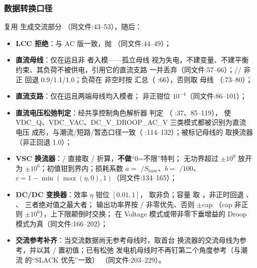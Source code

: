\subsubsection*{数据转换口径}
 复用  生成交流部分
（同文件:43--53），随后：
\begin{itemize}
  \item \textbf{LCC 拒绝}：与 AC 版一致，抛 
        （同文件:44--49）；
  \item \textbf{直流母线}：仅在运且非  者入模——孤立母线
        视为失电，不建变量、不建平衡约束、其负荷不被供电，引用它的直流支路
        一并丢弃（同文件:57--66）；// 非正
        回退 0.9/1.1/1.0；负荷在  非空时按
         汇总（
        :66），否则取
        母线 （:73--80）；
  \item \textbf{直流支路}：仅在运且两端母线均入模者； 非正钳位
        $10^{-4}$（同文件:86--101）；
  \item \textbf{直流电压松弛判定}：经共享控制角色解析器
         判定
        （
        :37、85--119），
        使 VDC\_Q、VDC\_VAC、DC\_V\_DROOP\_AC\_V 三类模式都被识别为直流电压
        成形，与潮流/短路/暂态口径一致（
        :114--132）；被标记母线的
         取换流器 （非正回退 1.0）；
  \item \textbf{VSC 换流器}：/ 直接取
        / 折算，\textbf{不做}“0=不限”特判；
        无功界超过 $\pm 10^{9}$ 放开为 $\pm 10^{6}$；初值钳到界内；损耗系数
        $a=$ $/S_{\mathrm{base}}$、$b=$ $/100$、
        $c=1-\min(\max(\eta,0),1)$（同文件:134--165）；
  \item \textbf{DC/DC 变换器}：效率 $\eta$ 钳位 $[0.01,1]$，
        取非负；容量  取 ，非正时回退 、
        、 三者绝对值之最大者；
        输出功率界按 / 非零优先、否则 $\pm$cap
        （cap 非正则 $\pm 10^{6}$），上下限颠倒时交换；
         在 Voltage 模式或带非零下垂增益的 Droop
        模式为真（同文件:166--202）；
  \item \textbf{交流参考补齐}：当交流数据尚无参考母线时，取首台
         换流器的交流母线为参考，并以其
        / 置初值；已有松弛
        发电机母线时不再钉第二个角度参考（与潮流
         的“SLACK 优先”一致）
        （同文件:203--229）。
\end{itemize}

